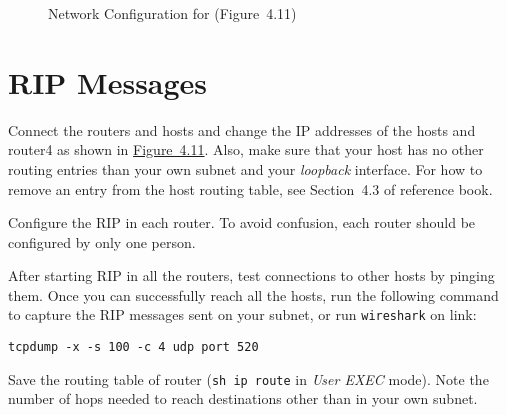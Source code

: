 \documentclass{../UTNetLab}
\begin{document}
\begin{figure}[H]
        \caption{Network Configuration for  (Figure~4.11)}\label{fig:4.11}
    \end{figure}
\section{RIP Messages}
    Connect the routers and hosts and change the IP addresses of the hosts and router4 as shown in \hyperref[fig:4.11]{Figure~4.11}.
    Also, make sure that your host has no other routing entries than your own subnet and your \textit{loopback} interface.
    For how to remove an entry from the host routing table, see Section~4.3 of reference book.

    Configure the RIP in each router.
    To avoid confusion, each router should be configured by only one person.

    After starting RIP in all the routers, test connections to other hosts by pinging them.
    Once you can successfully reach all the hosts, run the following command to capture the RIP messages sent on your subnet, or run \lstinline{wireshark} on link:
    \begin{lstlisting}
tcpdump -x -s 100 -c 4 udp port 520
    \end{lstlisting}

    Save the routing table of router (\lstinline{sh ip route} in \textit{User EXEC} mode).
    Note the number of hops needed to reach destinations other than in your own subnet.
\end{document}
